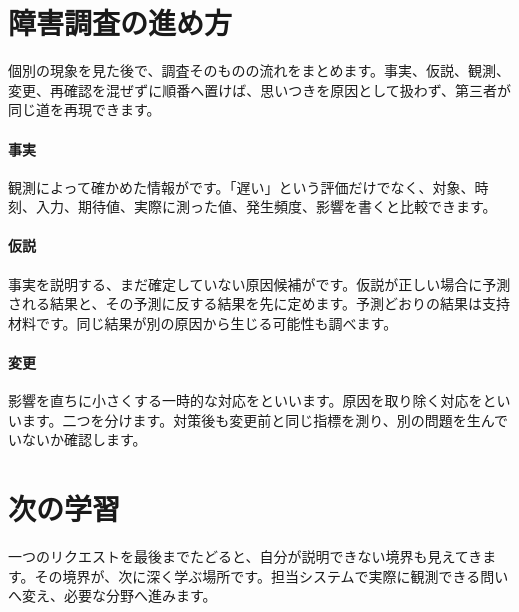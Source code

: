 \section{障害調査の進め方}
\label{sec:07-practice-13}

個別の現象を見た後で、調査そのものの流れをまとめます。事実、仮説、観測、変更、再確認を混ぜずに順番へ置けば、思いつきを原因として扱わず、第三者が同じ道を再現できます。

\begingroup
  \centering
  \vspace{6mm}
\begingroup
\paragraph{事実}
        観測によって確かめた情報がです。「遅い」という評価だけでなく、対象、時刻、入力、期待値、実際に測った値、発生頻度、影響を書くと比較できます。

\par
\endgroup
\medskip
\begingroup
\paragraph{仮説}
        事実を説明する、まだ確定していない原因候補がです。仮説が正しい場合に予測される結果と、その予測に反する結果を先に定めます。予測どおりの結果は支持材料です。同じ結果が別の原因から生じる可能性も調べます。

\par
\endgroup
\medskip
\begingroup
\paragraph{変更}
        影響を直ちに小さくする一時的な対応をといいます。原因を取り除く対応をといいます。二つを分けます。対策後も変更前と同じ指標を測り、別の問題を生んでいないか確認します。

\par
\endgroup
\par
\endgroup


\section{次の学習}
\label{sec:07-practice-14}

一つのリクエストを最後までたどると、自分が説明できない境界も見えてきます。その境界が、次に深く学ぶ場所です。担当システムで実際に観測できる問いへ変え、必要な分野へ進みます。

